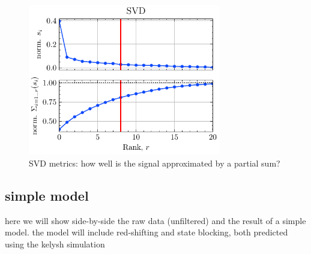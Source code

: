 \begin{figure}
	\centering
	\includegraphics[width=0.75\textwidth]{figures/chap4/OD_df_125Hz_Delay1-6_SVD_qual.pdf}
	\caption{SVD metrics: how well is the signal approximated by a partial sum?}
	\label{fig:OD_df_125Hz_Delay1-6_SVD_qual}
\end{figure}

\subsection{simple model}

here we will show side-by-side the raw data (unfiltered) and the result of a simple model. the model will include red-shifting and state blocking, both predicted using the kelysh simulation
